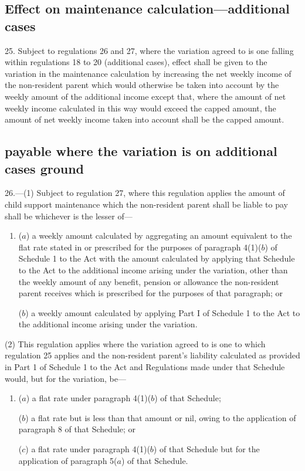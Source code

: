 \documentclass[12pt,a4paper]{article}
\begin{document}
\subsection[25. Effect on maintenance calculation—additional cases]{Effect on maintenance calculation—additional cases}

25.  Subject to regulations 26 and 27, where the variation agreed to is one falling within regulations 18 to 20 (additional cases), effect shall be given to the variation in the maintenance calculation by increasing the net weekly income of the non-resident parent which would otherwise be taken into account by the weekly amount of the additional income except that, where the amount of net weekly income calculated in this way would exceed the capped amount, the amount of net weekly income taken into account shall be the capped amount.

\subsection[26. Effect on maintenance calculation—maximum amount payable where the variation is on additional cases ground]{\sloppy {} payable where the variation is on additional cases ground}

26.---(1)  Subject to regulation 27, where this regulation applies the amount of child support maintenance which the non-resident parent shall be liable to pay shall be whichever is the lesser of—
\begin{enumerate}\item[]
($a$) a weekly amount calculated by aggregating an amount equivalent to the flat rate stated in or prescribed for the purposes of paragraph 4(1)($b$)  of Schedule 1 to the Act with the amount calculated by applying that Schedule to the Act to the additional income arising under the variation, other than the weekly amount of any benefit, pension or allowance the non-resident parent receives which is prescribed for the purposes of that paragraph; or

($b$) a weekly amount calculated by applying Part I of Schedule 1 to the Act to the additional income arising under the variation.
\end{enumerate}

(2) This regulation applies where the variation agreed to is one to which regulation 25 applies and the non-resident parent’s liability calculated as provided in Part 1 of Schedule 1 to the Act and Regulations made under that Schedule would, but for the variation, be—
\begin{enumerate}\item[]
($a$) a flat rate under paragraph 4(1)($b$)  of that Schedule;

($b$) a flat rate but is less than that amount or nil, owing to the application of paragraph 8 of that Schedule; or

($c$) a flat rate under paragraph 4(1)($b$)  of that Schedule but for the application of paragraph 5($a$)  of that Schedule.
\end{enumerate}
\end{document}
